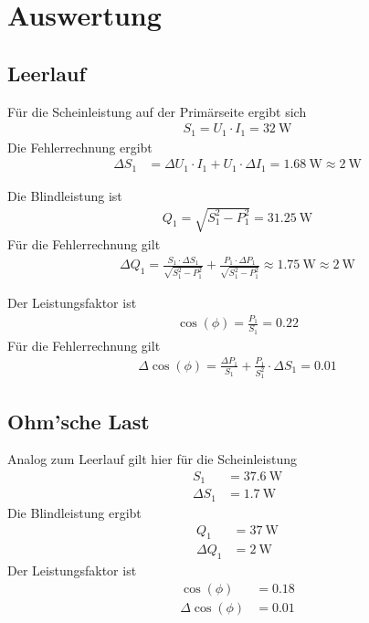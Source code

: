 \documentclass{article}
\newcommand{\W}{\text{W}}
\begin{document}
\section{Auswertung}

\subsection{Leerlauf}
Für die Scheinleistung auf der Primärseite ergibt sich
\begin{align*}
S_1 = U_1\cdot I_1 = 32~\text{W}
\end{align*}
Die Fehlerrechnung ergibt
\begin{align*}
\Delta S_1 &= \Delta U_1\cdot I_1 + U_1\cdot \Delta I_1 = 1.68~\W \approx 2~\W
\end{align*}

Die Blindleistung ist
\begin{align*}
Q_1 = \sqrt{S_1^2 - P_1^2} = 31.25~\W
\end{align*}
Für die Fehlerrechnung gilt
\begin{align*}
\Delta Q_1 = \frac{S_1\cdot \Delta S_1}{\sqrt{S_1^2-P_1^2}} + \frac{P_1\cdot \Delta P_1}{\sqrt{S_1^2-P_1^2}} \approx 1.75~\W \approx 2~\W
\end{align*}

Der Leistungsfaktor ist
\begin{align*}
\cos(\phi) = \frac{P_1}{S_1} = 0.22
\end{align*}
Für die Fehlerrechnung gilt
\begin{align*}
\Delta\cos(\phi) = \frac{\Delta P_1}{S_1} + \frac{P_1}{S_1^2}\cdot \Delta S_1 = 0.01
\end{align*}

\subsection{Ohm'sche Last}

Analog zum Leerlauf gilt hier für die Scheinleistung
\begin{align*}
S_1 &= 37.6~\W \\
\Delta S_1 &= 1.7~\W
\end{align*}
Die Blindleistung ergibt
\begin{align*}
Q_1 &= 37~\W \\
\Delta Q_1 &= 2~\W
\end{align*}
Der Leistungsfaktor ist
\begin{align*}
\cos(\phi) &= 0.18 \\
\Delta \cos(\phi) &= 0.01
\end{align*}
\end{document}
